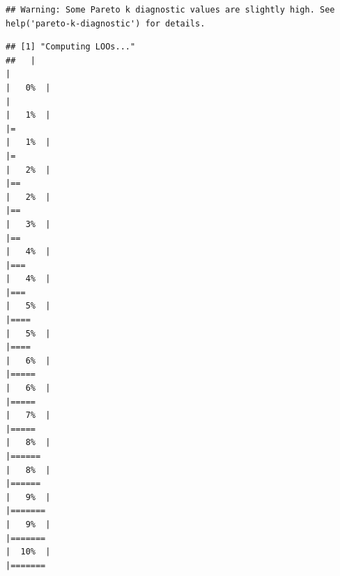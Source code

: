 \documentclass[
]{article}
\begin{document}
\begin{verbatim}
## Warning: Some Pareto k diagnostic values are slightly high. See help('pareto-k-diagnostic') for details.
\end{verbatim}

\begin{verbatim}
## [1] "Computing LOOs..."
##   |                                                                              |                                                                      |   0%  |                                                                              |                                                                      |   1%  |                                                                              |=                                                                     |   1%  |                                                                              |=                                                                     |   2%  |                                                                              |==                                                                    |   2%  |                                                                              |==                                                                    |   3%  |                                                                              |==                                                                    |   4%  |                                                                              |===                                                                   |   4%  |                                                                              |===                                                                   |   5%  |                                                                              |====                                                                  |   5%  |                                                                              |====                                                                  |   6%  |                                                                              |=====                                                                 |   6%  |                                                                              |=====                                                                 |   7%  |                                                                              |=====                                                                 |   8%  |                                                                              |======                                                                |   8%  |                                                                              |======                                                                |   9%  |                                                                              |=======                                                               |   9%  |                                                                              |=======                                                               |  10%  |                                                                              |=======       
\end{verbatim}
\end{document}
